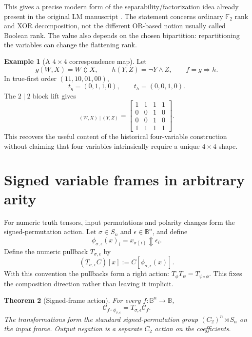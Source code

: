 \documentclass[11pt]{article}
\newtheorem{theorem}{Theorem}[section]
\theoremstyle{definition}
\newtheorem{example}[theorem]{Example}
\theoremstyle{remark}
\newcommand{\B}{\mathbb B}
\newcommand{\F}{\mathbb F}
\newcommand{\cC}{\mathcal C}
\newcommand{\xor}{\mathbin{\Updownarrow}}
\begin{document}
This gives a precise modern form of the separability/factorization idea already present in the original LM manuscript \cite{Droncheff2018}.  The statement concerns ordinary $\F_2$ rank and XOR decomposition, not the different OR-based notion usually called Boolean rank.  The value also depends on the chosen bipartition: repartitioning the variables can change the flattening rank.

\begin{example}[A $4\times4$ correspondence map]
Let
\[
 g(W,X)=W\xor X,\qquad
 h(Y,Z)=\neg Y\land Z,\qquad
 f=g\Rightarrow h.
\]
In true-first order $(11,10,01,00)$,
\[
 t_g=(0,1,1,0),\qquad t_h=(0,0,1,0).
\]
The $2\mid2$ block lift gives
\begin{equation}
 [f]_{(W,X)\mid(Y,Z)}=
 \begin{bmatrix}
 1&1&1&1\\
 0&0&1&0\\
 0&0&1&0\\
 1&1&1&1
 \end{bmatrix}.
 \label{eq:fourbyfour}
\end{equation}
This recovers the useful content of the historical four-variable construction without claiming that four variables intrinsically require a unique $4\times4$ shape.
\end{example}

\section{Signed variable frames in arbitrary arity}
\label{sec:frames}

For numeric truth tensors, input permutations and polarity changes form the signed-permutation action.  Let $\sigma\in S_n$ and $\epsilon\in\B^n$, and define
\begin{equation}
 \phi_{\sigma,\epsilon}(x)_i=x_{\sigma(i)}\xor\epsilon_i.
 \label{eq:signedmap}
\end{equation}
Define the numeric pullback $T_{\sigma,\epsilon}$ by
\[
 (T_{\sigma,\epsilon}C)[x]:=C[\phi_{\sigma,\epsilon}(x)].
\]
With this convention the pullbacks form a right action: $T_{\phi}T_{\psi}=T_{\psi\circ\phi}$.  This fixes the composition direction rather than leaving it implicit.
\begin{theorem}[Signed-frame action]
For every $f:\B^n\to\B$,
\begin{equation}
 \cC_{f\circ\phi_{\sigma,\epsilon}}
 =T_{\sigma,\epsilon}\cC_f.
 \label{eq:signedaction}
\end{equation}
The transformations form the standard signed-permutation group $(C_2)^n\rtimes S_n$ on the input frame.  Output negation is a separate $C_2$ action on the coefficients.
\end{theorem}
\end{document}

